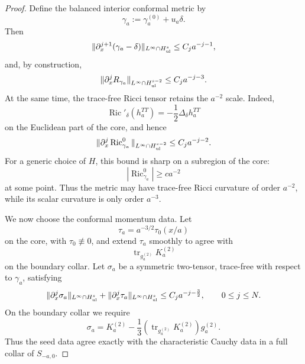 \documentclass{amsart}
\begin{document}
{\begin{proof}
\noindent Define the balanced interior conformal metric by
\[
        \gamma_a
        :=
        \gamma_a^{(0)}+u_a\delta.
\]
Then
\begin{equation}
\label{eq:gamma-balanced-estimate}
        \|\partial_x^{j+1}(\gamma_a-\delta)\|_{L^\infty\cap H^s_{\rm ul}}
        \le C_j a^{-j-1},
\end{equation}
and, by construction,
\begin{equation}
\label{eq:scalar-small}
        \|\partial_x^j R_{\gamma_a}\|_{L^\infty\cap H^{s-2}_{\rm ul}}
        \le C_j a^{-j-3}.
\end{equation}
At the same time, the trace-free Ricci tensor retains the \(a^{-2}\)
scale. Indeed,
\[
        \operatorname{Ric}'_\delta(h_a^{TT})
        =
        -\frac12\Delta_\delta h_a^{TT}
\]
on the Euclidean part of the core, and hence
\[
        \|\partial_x^j\operatorname{Ric}^0_{\gamma_a}\|_{L^\infty\cap H^{s-2}_{\rm ul}}
        \le C_j a^{-j-2}.
\]
For a generic choice of \(H\), this bound is sharp on a subregion of the
core:
\[
        |\operatorname{Ric}^0_{\gamma_a}|
        \ge c a^{-2}
\]
at some point. Thus the metric may have trace-free Ricci curvature of
order \(a^{-2}\), while its scalar curvature is only order \(a^{-3}\).

\noindent We now choose the conformal momentum data. Let
\[
        \tau_a=a^{-3/2}\tau_0(x/a)
\]
on the core, with \(\tau_0\not\equiv0\), and extend \(\tau_a\) smoothly
to agree with
\[
        \operatorname{tr}_{g_a^{(2)}}K_a^{(2)}
\]
on the boundary collar. Let \(\sigma_a\) be a symmetric two-tensor,
trace-free with respect to \(\gamma_a\), satisfying
\begin{equation}
\label{eq:sigma-tau-bounds}
        \|\partial_x^j\sigma_a\|_{L^\infty\cap H^s_{\rm ul}}
        +
        \|\partial_x^j\tau_a\|_{L^\infty\cap H^s_{\rm ul}}
        \le C_j a^{-j-\frac32},
        \qquad 0\le j\le N.
\end{equation}
On the boundary collar we require
\[
        \sigma_a
        =
        K_a^{(2)}
        -
        \frac13
        \left(
        \operatorname{tr}_{g_a^{(2)}}K_a^{(2)}
        \right)
        g_a^{(2)}.
\]
Thus the seed data agree exactly with the characteristic Cauchy data in
a full collar of \(S_{-a,0}\).


\end{proof}}
\end{document}
